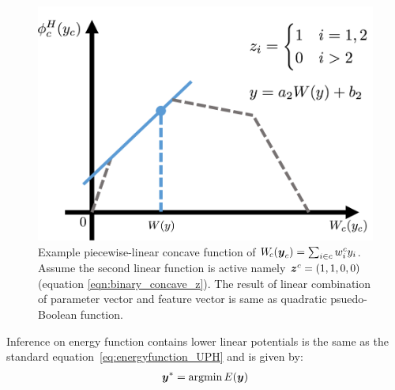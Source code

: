 \documentclass[sigconf,anonymous,review]{acmart}
\begin{document}
\begin{figure}[t]
  \centering
  \includegraphics[width=0.8\columnwidth]{Methodology/figures/linEnvLatentFig.png}
  \caption{\label{fig:concave} Example piecewise-linear concave
    function of $W_{\!c}({\boldsymbol{y}}_c) = \sum_{i \in c} w^c_i y_i$.
    Assume the second linear function is active namely
    ${\boldsymbol{z}}^c=(1,1,0,0)$ (equation \ref{eqn:binary_concave_z}). The result of linear combination of
    parameter vector and feature vector is same as quadratic
    psuedo-Boolean function.}
\end{figure}


Inference on energy function contains lower linear potentials is
the same as the standard equation~\eqref{eq:energyfunction_UPH}
and is given by:
\begin{align}
  \label{eq:min_energy}
  {\boldsymbol{y}}^* = \mathop{\textrm{argmin}}E\!\left({\boldsymbol{y}}\right)
\end{align}
\end{document}
